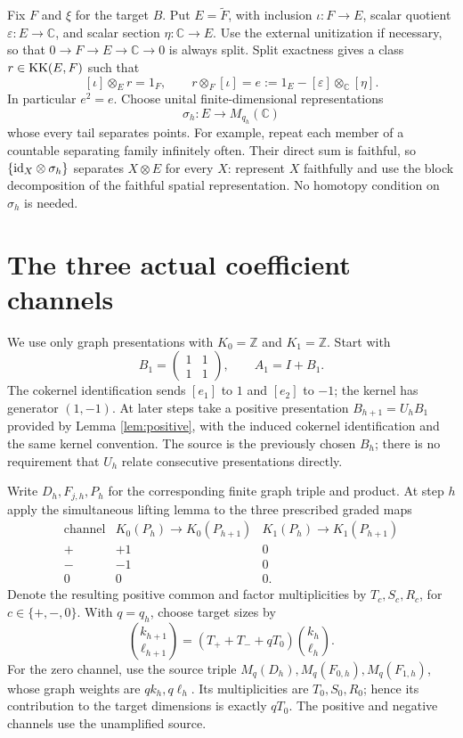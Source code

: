 \documentclass[11pt]{article}
\theoremstyle{remark}\newtheorem{remark}[theorem]{Remark}
\newcommand{\Z}{\mathbb Z}\newcommand{\C}{\mathbb C}
\begin{document}
Fix $F$ and $\xi$ for the target $B$. Put $E=\widetilde F$, with
inclusion $\iota:F\to E$, scalar quotient $\varepsilon:E\to\C$,
and scalar section $\eta:\C\to E$. Use the external unitization if
necessary, so that $0\to F\to E\to\C\to0$ is always split.
Split exactness gives a class $r\in\operatorname{KK}(E,F)$ such that
\begin{equation}\label{eq:split}
 [\iota]\otimes_Er=1_F,\qquad
 r\otimes_F[\iota]=e:=1_E-[\varepsilon]\otimes_\C[\eta].
\end{equation}
In particular $e^2=e$. Choose unital finite-dimensional representations
\[
                 \sigma_h:E\longrightarrow M_{q_h}(\C)
\]
whose every tail separates points. For example, repeat each member of
a countable separating family infinitely often. Their direct sum is
faithful, so $\{\mathrm{id}_X\otimes\sigma_h\}$ separates $X\otimes E$ for
every $X$: represent $X$ faithfully and use the block decomposition of
the faithful spatial representation. No homotopy condition on $\sigma_h$
is needed.

\section{The three actual coefficient channels}\label{sec:channels}
We use only graph presentations with $K_0=\Z$ and $K_1=\Z$.
Start with
\[
 B_1=\begin{pmatrix}1&1\\1&1\end{pmatrix},\qquad A_1=I+B_1.
\]
The cokernel identification sends $[e_1]$ to $1$ and $[e_2]$ to $-1$;
the kernel has generator $(1,-1)$. At later steps take a positive
presentation $B_{h+1}=U_hB_1$ provided by Lemma \ref{lem:positive},
with the induced cokernel identification and the same kernel convention.
The source is the previously chosen $B_h$; there is no requirement that
$U_h$ relate consecutive presentations directly.

Write $D_h,F_{j,h},P_h$ for the corresponding finite graph triple and
product. At step $h$ apply the simultaneous lifting lemma to the three
prescribed graded maps
\begin{equation}\label{eq:threeK}
 \begin{array}{c|cc}
 \text{channel}&K_0(P_h)\to K_0(P_{h+1})&K_1(P_h)\to K_1(P_{h+1})\\\hline
 +&+1&0\\
 -&-1&0\\
 0&0&0.
 \end{array}
\end{equation}
Denote the resulting positive common and factor multiplicities by
$T_c,S_c,R_c$, for $c\in\{+,-,0\}$. With $q=q_h$, choose target sizes
by
\begin{equation}\label{eq:dimensions}
 \binom{k_{h+1}}{\ell_{h+1}}
       =(T_++T_-+qT_0)\binom{k_h}{\ell_h}.
\end{equation}
For the zero channel, use the source triple
$M_q(D_h),M_q(F_{0,h}),M_q(F_{1,h})$, whose graph weights are
$qk_h,q\ell_h$. Its multiplicities are $T_0,S_0,R_0$; hence its
contribution to the target dimensions is exactly $qT_0$.
The positive and negative channels use the unamplified source.
\end{document}
